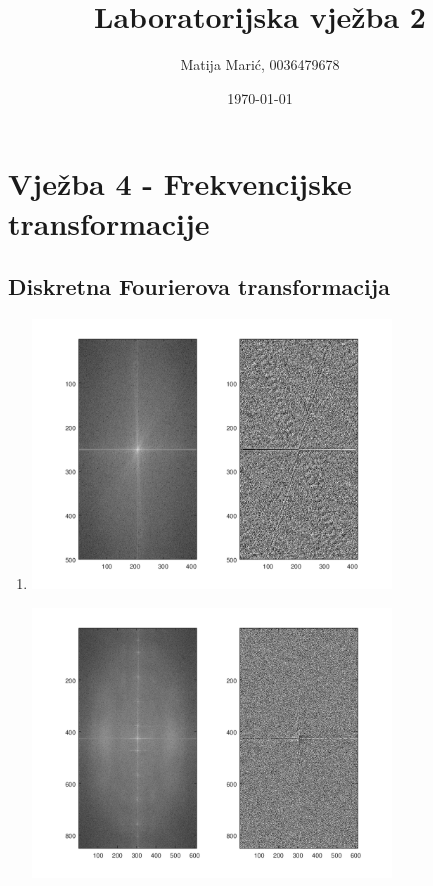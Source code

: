 \documentclass[12pt, a4]{report}
\title{Laboratorijska vježba 2}
\author{Matija Marić, 0036479678}
\date{\today}
\begin{document}
        \begin{titlepage}
            \maketitle
        \end{titlepage}

        \tableofcontents{}

        \chapter{Vježba 4 - Frekvencijske transformacije}
        \section{Diskretna Fourierova transformacija}
            \begin{enumerate}
                \item
                    \begin{minipage}{\linewidth}
                        \centering
                        \includegraphics[width=0.75\textwidth]{fft1}
                    \end{minipage}
                    \begin{minipage}{\linewidth}
                        \centering
                        \includegraphics[width=0.75\textwidth]{fft2}
                    \end{minipage}
            \end{enumerate}
        
\end{document}
